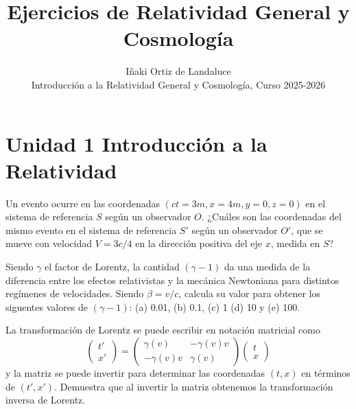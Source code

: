 \documentclass[12pt]{article}
\newenvironment{exercise}[2][Ejercicio]{\begin{trivlist} 
\item[\hskip \labelsep {\bfseries #1}\hskip \labelsep {\bfseries #2.}]}{\end{trivlist}}
\begin{document}
 
 
\title{Ejercicios de Relatividad General y Cosmología}
\author{Iñaki Ortiz de Landaluce\\ 
Introducción a la Relatividad General y Cosmología, Curso 2025-2026}
\date{} 
\maketitle

\section*{Unidad 1 Introducción a la Relatividad}

\begin{exercise}{1.1}
Un evento ocurre en las coordenadas $(ct=3m, x=4m, y=0, z=0)$ en el sistema de referencia 
$S$ según un observador $O$. ¿Cuáles son las coordenadas del mismo evento en el sistema de referencia 
$S'$ según un observador $O'$, que se mueve con velocidad $V=3c/4$ en la dirección positiva del eje 
$x$, medida en $S$?
\end{exercise}

\begin{exercise}{1.2} Siendo $\gamma$ el factor de Lorentz, la cantidad $(\gamma -1)$ da una medida de la diferencia entre los efectos relativistas y la mecánica Newtoniana para distintos regímenes de velocidades. Siendo $\beta=v/c$, calcula su valor para obtener los siguentes valores de $(\gamma-1)$: (a) 0.01, (b) 0.1, (c) 1 (d) 10 y (e) 100.
\end{exercise}

\begin{exercise}{1.3}  La transformación de Lorentz se puede escribir en notación matricial como
\[
\begin{pmatrix}
t' \\
x'
\end{pmatrix}
=
\begin{pmatrix}
\gamma(v) & -\gamma(v)v \\
-\gamma(v)v & \gamma(v)
\end{pmatrix}
\begin{pmatrix}
t \\
x
\end{pmatrix}
\]
y la matriz  se puede invertir para determinar las coordenadas $(t,x)$ en términos de $(t', x')$. Demuestra que al invertir la matriz obtenemos la transformación inversa de Lorentz.
\end{exercise}
\end{document}
